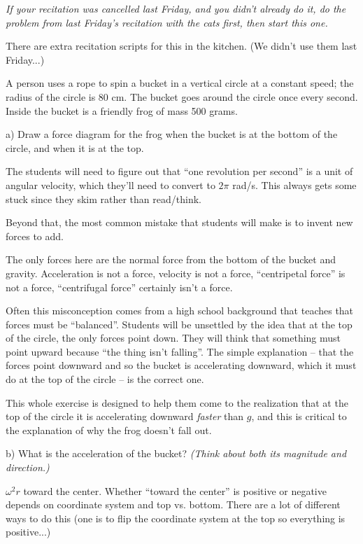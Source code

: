 \documentclass[12pt]{article}
\begin{document}
\Large
\centerline{}
\normalsize
\centerline{}

{\it If your recitation was cancelled last Friday, and you didn't already do it, do the problem from last Friday's recitation with the cats first, then start this one.}


{\color{Red} There are extra recitation scripts for this in the kitchen. (We didn't use them last Friday...)}

A person uses a rope to spin a bucket in a vertical circle at a constant speed; the radius of the circle is 80 cm. The bucket goes around the circle once every second. Inside the bucket is a friendly frog of mass 500 grams. 


a) Draw a force diagram for the frog when the bucket is at the bottom of the circle, and when it is at the top.

{\color{Red}
	The students will need to figure out that ``one revolution per second'' is a unit of angular velocity, which they'll need to convert to $2\pi$ rad/s. This always gets some stuck since they skim rather than read/think.
	
	Beyond that, the most common mistake that students will make is to invent new forces to add.
	

		The only forces here are the normal force from the bottom of the bucket and gravity. Acceleration is not a force, velocity is not a force, ``centripetal force'' is not a force, ``centrifugal force'' certainly isn't a force.
		
		Often this misconception comes from a high school background that teaches that forces must be ``balanced''. Students will be unsettled by the idea that at the top of the circle, the only forces point down. They will think that something must point upward because ``the thing isn't falling''. The simple explanation -- that the forces point downward and so the bucket is accelerating downward, which it must do at the top of the circle -- is the correct one. 
		
		This whole exercise is designed to help them come to the realization that at the top of the circle it is accelerating downward {\it faster} than $g$, and this is critical to the explanation of why the frog doesn't fall out.
}

b) What is the acceleration of the bucket? {\it (Think about both its magnitude and direction.)}

{\color{Red} $\omega^2 r$ toward the center. Whether ``toward the center'' is positive or negative depends on coordinate system and top vs. bottom. There are a lot of different ways to do this (one is to flip the coordinate system at the top so everything is positive...)}
\end{document}
